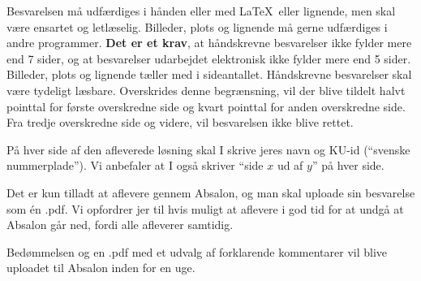 \documentclass{article}
\begin{document}
	\bigskip  
	\noindent
	Besvarelsen må udfærdiges i hånden eller med \LaTeX\ eller lignende, men skal være ensartet og letlæselig. Billeder, plots og lignende må gerne udfærdiges i andre programmer. \textbf{Det er et krav}, at håndskrevne besvarelser ikke fylder mere end 7 sider,
	og at besvarelser udarbejdet elektronisk ikke fylder mere end 5 sider. Billeder, plots og lignende tæller med i sideantallet. Håndskrevne besvarelser skal være tydeligt læsbare.
	Overskrides denne begrænsning, vil der blive tildelt halvt pointtal for første overskredne side og kvart pointtal for anden overskredne side. Fra tredje overskredne side og videre, vil besvarelsen ikke blive rettet.
	
	\bigskip 
	\noindent
	P\aa{} hver side af den afleverede l\o{}sning skal I skrive jeres navn og KU-id (``svenske nummerplade''). Vi anbefaler at I ogs\aa{} skriver ``side $x$ ud af $y$'' p\aa{} hver side.
	
	\bigskip 
	\noindent
	Det er kun tilladt at aflevere gennem Absalon, og man skal uploade sin besvarelse som én .pdf. Vi opfordrer jer til hvis muligt at aflevere i god tid for at undgå at Absalon går ned, fordi alle afleverer samtidig.
	
	\bigskip
	\noindent
	Bedømmelsen og en .pdf med et udvalg af forklarende kommentarer vil blive uploadet til Absalon inden for en uge.
	\fi
\end{document}
